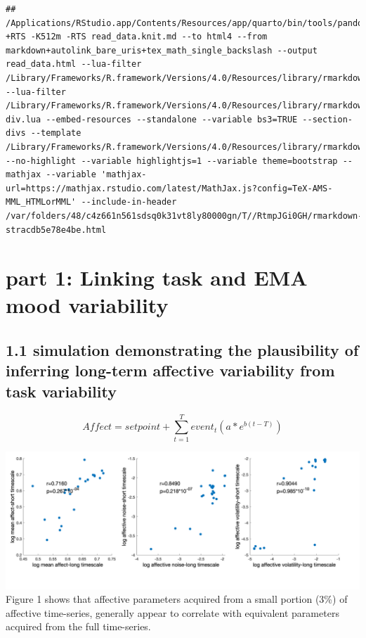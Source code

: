 \documentclass[
]{article}
\begin{document}
\begin{verbatim}
## /Applications/RStudio.app/Contents/Resources/app/quarto/bin/tools/pandoc +RTS -K512m -RTS read_data.knit.md --to html4 --from markdown+autolink_bare_uris+tex_math_single_backslash --output read_data.html --lua-filter /Library/Frameworks/R.framework/Versions/4.0/Resources/library/rmarkdown/rmarkdown/lua/pagebreak.lua --lua-filter /Library/Frameworks/R.framework/Versions/4.0/Resources/library/rmarkdown/rmarkdown/lua/latex-div.lua --embed-resources --standalone --variable bs3=TRUE --section-divs --template /Library/Frameworks/R.framework/Versions/4.0/Resources/library/rmarkdown/rmd/h/default.html --no-highlight --variable highlightjs=1 --variable theme=bootstrap --mathjax --variable 'mathjax-url=https://mathjax.rstudio.com/latest/MathJax.js?config=TeX-AMS-MML_HTMLorMML' --include-in-header /var/folders/48/c4z661n561sdsq0k31vt8ly80000gn/T//RtmpJGi0GH/rmarkdown-stracdb5e78e4be.html
\end{verbatim}

\hypertarget{part-1-linking-task-and-ema-mood-variability}{%
\section{part 1: Linking task and EMA mood
variability}\label{part-1-linking-task-and-ema-mood-variability}}

\hypertarget{simulation-demonstrating-the-plausibility-of-inferring-long-term-affective-variability-from-task-variability}{%
\subsection{1.1 simulation demonstrating the plausibility of inferring
long-term affective variability from task
variability}\label{simulation-demonstrating-the-plausibility-of-inferring-long-term-affective-variability-from-task-variability}}

\[Affect = setpoint + \sum_{t=1}^{T}event_t(a*e^{b(t-T)})\]

\includegraphics{./figures/figure_SimCorr.png} Figure 1 shows that
affective parameters acquired from a small portion (3\%) of affective
time-series, generally appear to correlate with equivalent parameters
acquired from the full time-series.
\end{document}
